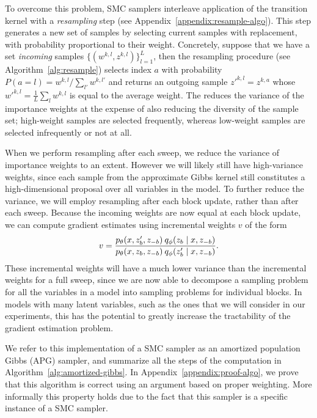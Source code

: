 \documentclass{article}
\theoremstyle{definition}
\begin{document}
To overcome this problem, SMC samplers interleave application of the transition kernel with a \emph{resampling} step (see Appendix~\ref{appendix:resample-algo}). This step generates a new set of samples by selecting current samples with replacement, with probability proportional to their weight. Concretely, suppose that we have a set \emph{incoming} samples $\{(w^{k,l}, z^{k,l})\}_{l=1}^L$, then the resampling procedure (see Algorithm~\ref{alg:resample}) selects index $a$ with probability $P(a\!=\!l) = w^{k,l} / \sum_{l'} w^{k,l'}$ and returns an outgoing sample $z'^{k,l} = z^{k,a}$ whose $w'^{k,l} = \frac{1}{L} \sum_l w^{k,l}$ is equal to the average weight. The reduces the variance of the importance weights at the expense of also reducing the diversity of the sample set; high-weight samples are selected frequently, whereas low-weight samples are selected infrequently or not at all.

When we perform resampling after each sweep, we reduce the variance of importance weights to an extent. However we will likely still have high-variance weights, since each sample from the approximate Gibbs kernel still constitutes a high-dimensional proposal over all variables in the model. To further reduce the variance, we will employ resampling after each block update, rather than after each sweep. Because the incoming weights are now equal at each block update, we can compute gradient estimates using incremental weights $v$ of the form
\begin{align}
    v
    = 
    \frac{p_\theta(x, z'_b, z_{-b}) \: q_\phi(z_b \mid  x, z_{-b})}
         {p_\theta(x, z_b, z_{-b}) \: q_\phi(z'_b \mid  x, z_{-b})}
    .
\end{align}
These incremental weights will have a much lower variance than the incremental weights for a full sweep, since we are now able to decompose a sampling problem for all the variables in a model into sampling problems for individual blocks. In models with many latent variables, such as the ones that we will consider in our experiments, this has the potential to greatly increase the tractability of the gradient estimation problem. 


We refer to this implementation of a SMC sampler as an amortized population Gibbs (APG) sampler, and summarize all the steps of the computation in Algorithm~\ref{alg:amortized-gibbs}. In Appendix~\ref{appendix:proof-algo}, we prove that this algorithm is correct using an argument based on proper weighting. More informally this property holds due to the fact that this sampler is a specific instance of a SMC sampler. 
\end{document}
